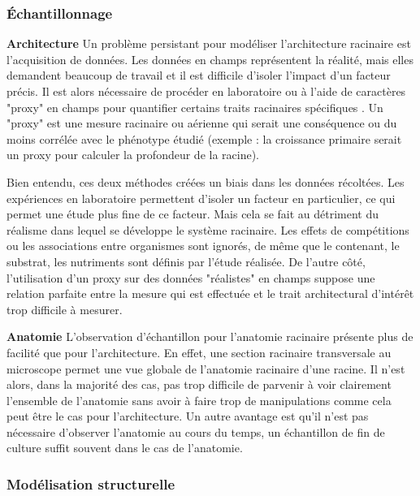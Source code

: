 \subsubsection{Échantillonnage}
\textbf{Architecture}
\newline
Un problème persistant pour modéliser l'architecture racinaire est l'acquisition de données.
Les données en champs représentent la réalité, mais elles demandent beaucoup de travail et il est difficile d'isoler l'impact d'un facteur précis.
Il est alors nécessaire de procéder en laboratoire ou à l'aide de caractères "proxy" en champs pour quantifier certains traits racinaires spécifiques \citep{wasson_traits_2012}.
Un "proxy" est une mesure racinaire ou aérienne qui serait une conséquence ou du moins corrélée avec le phénotype étudié (exemple : la croissance primaire serait un proxy pour calculer la profondeur de la racine).
\newline

Bien entendu, ces deux méthodes créées un biais dans les données récoltées.
Les expériences en laboratoire permettent d'isoler un facteur en particulier, ce qui permet une étude plus fine de ce facteur.
Mais cela se fait au détriment du réalisme dans lequel se développe le système racinaire.
Les effets de compétitions ou les associations entre organismes sont ignorés, de même que le contenant, le substrat, les nutriments sont définis par l'étude réalisée.
De l'autre côté, l'utilisation d'un proxy sur des données "réalistes" en champs suppose une relation parfaite entre la mesure qui est effectuée et le trait architectural d'intérêt trop difficile à mesurer.
\newline

\textbf{Anatomie}
\newline
L'observation d'échantillon pour l'anatomie racinaire présente plus de facilité que pour l'architecture.
En effet, une section racinaire transversale au microscope permet une vue globale de l'anatomie racinaire d'une racine.
Il n'est alors, dans la majorité des cas, pas trop difficile de parvenir à voir clairement l'ensemble de l'anatomie sans avoir à faire trop de manipulations comme cela peut être le cas pour l'architecture.
Un autre avantage est qu'il n'est pas nécessaire d'observer l'anatomie au cours du temps, un échantillon de fin de culture suffit souvent dans le cas de l'anatomie.

\subsubsection{Modélisation structurelle}

